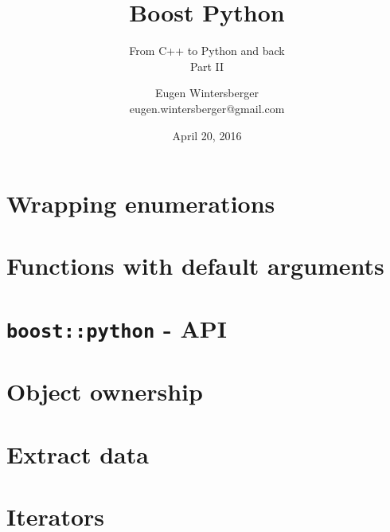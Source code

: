 \documentclass{beamer}
\title{{\Huge Boost Python}}
\subtitle{From C++ to Python and back \\ Part II}
\author{Eugen Wintersberger\\ \small{eugen.wintersberger@gmail.com}}
\date{April 20, 2016}
\begin{document}
\frame{\titlepage}

\part{Wrapping enumerations}
\frame{\partpage}



\part{Functions with default arguments}
\frame{\partpage}


\part{\texttt{boost::python} - API}
\frame{\partpage}


\part{Object ownership}
\frame{\partpage}


\part{Extract data}
\frame{\partpage}


\part{Iterators}
\frame{\partpage}

\end{document}
